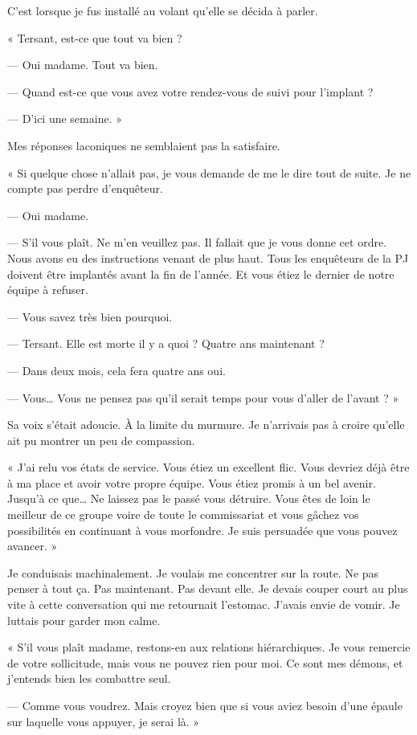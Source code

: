C'est lorsque je fus installé au volant qu'elle se décida à parler.

« Tersant, est-ce que tout va bien ?

— Oui madame. Tout va bien.

— Quand est-ce que vous avez votre rendez-vous de suivi pour l'implant ?

— D'ici une semaine. »

Mes réponses laconiques ne semblaient pas la satisfaire.

« Si quelque chose n'allait pas, je vous demande de me le dire tout de suite. Je ne compte pas perdre d'enquêteur.

— Oui madame.

— S'il vous plaît. Ne m'en veuillez pas. Il fallait que je vous donne cet ordre. Nous avons eu des instructions venant 
de plus haut. Tous les enquêteurs de la PJ doivent être implantés avant la fin de l'année. Et vous étiez le dernier de 
notre équipe à refuser.

— Vous savez très bien pourquoi.

— Tersant. Elle est morte il y a quoi ? Quatre ans maintenant ?

— Dans deux mois, cela fera quatre ans oui.

— Vous… Vous ne pensez pas qu'il serait temps pour vous d'aller de l'avant ? »

Sa voix s'était adoucie. À la limite du murmure. Je n'arrivais pas à croire qu'elle ait pu montrer un peu de compassion.

« J'ai relu vos états de service. Vous étiez un excellent flic. Vous devriez déjà être à ma place et avoir votre 
propre équipe. Vous étiez promis à un bel avenir. Jusqu'à ce que… Ne laissez pas le passé vous détruire. Vous êtes de 
loin le meilleur de ce groupe voire de toute le commissariat et vous gâchez vos possibilités en continuant à vous 
morfondre. Je suis persuadée que vous pouvez avancer. »

Je conduisais machinalement. Je voulais me concentrer sur la route. Ne pas penser à tout ça. Pas maintenant. Pas devant 
elle. Je devais couper court au plus vite à cette conversation qui me retournait l'estomac. J'avais envie de vomir. Je 
luttais pour garder mon calme.

« S'il vous plaît madame, restons-en aux relations hiérarchiques. Je vous remercie de votre sollicitude, mais vous ne 
pouvez rien pour moi. Ce sont mes démons, et j'entends bien les combattre seul.

— Comme vous voudrez. Mais croyez bien que si vous aviez besoin d'une épaule sur laquelle vous appuyer, je serai là. »

